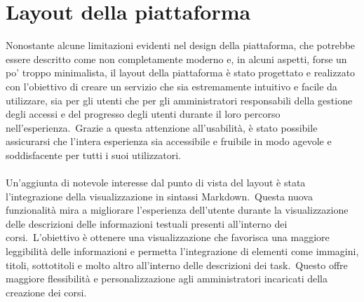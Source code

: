 \section{Layout della piattaforma}\label{sec:cap_sec_subsec}
Nonostante alcune limitazioni evidenti nel design della piattaforma, che potrebbe essere descritto come non completamente moderno e, 
in alcuni aspetti, forse un po' troppo minimalista, il layout della piattaforma è stato progettato e realizzato con l'obiettivo di 
creare un servizio che sia estremamente intuitivo e facile da utilizzare, sia per gli utenti 
che per gli amministratori responsabili della gestione degli accessi e del progresso degli utenti 
durante il loro percorso nell'esperienza.\ Grazie a questa attenzione all'usabilità, 
è stato possibile assicurarsi che l'intera esperienza sia accessibile e fruibile in modo agevole 
e soddisfacente per tutti i suoi utilizzatori.
\\ \\
Un'aggiunta di notevole interesse dal punto di vista del layout è stata l'integrazione 
della visualizzazione in sintassi Markdown.\ Questa nuova funzionalità mira a migliorare 
l'esperienza dell'utente durante la visualizzazione delle descrizioni delle informazioni 
testuali presenti all'interno dei corsi.\ L'obiettivo è ottenere una visualizzazione che 
favorisca una maggiore leggibilità delle informazioni e permetta l'integrazione di 
elementi come immagini, titoli, sottotitoli e molto altro all'interno delle descrizioni 
dei task.\ Questo offre maggiore flessibilità e personalizzazione agli amministratori 
incaricati della creazione dei corsi.
